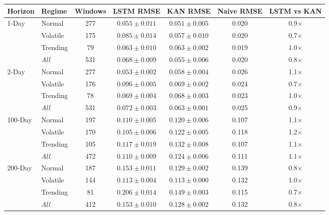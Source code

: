 \begin{table}[!ht]
\centering
\scriptsize
\renewcommand{\arraystretch}{1.15}
\setlength{\tabcolsep}{4pt}
\begin{tabular}{|l|l|c|c|c|c|c|}
\hline
\textbf{Horizon} & \textbf{Regime} & \textbf{Windows} & \textbf{LSTM RMSE} & \textbf{KAN RMSE} & \textbf{Naive RMSE} & \textbf{LSTM vs KAN} \\
\hline
  \multirow{3}{*}{1-Day} & Normal & 277 & $0.055 \pm 0.011$ & $0.051 \pm 0.005$ & 0.020 & 0.9$\times$ \\
   & Volatile & 175 & $0.085 \pm 0.014$ & $0.057 \pm 0.010$ & 0.020 & 0.7$\times$ \\
   & Trending & 79 & $0.063 \pm 0.010$ & $0.063 \pm 0.002$ & 0.019 & 1.0$\times$ \\
  & \textit{All} & 531 & $0.068 \pm 0.009$ & $0.055 \pm 0.006$ & 0.020 & 0.8$\times$ \\
\hline
  \multirow{3}{*}{2-Day} & Normal & 277 & $0.053 \pm 0.002$ & $0.058 \pm 0.004$ & 0.026 & 1.1$\times$ \\
   & Volatile & 176 & $0.096 \pm 0.005$ & $0.069 \pm 0.002$ & 0.024 & 0.7$\times$ \\
   & Trending & 78 & $0.069 \pm 0.004$ & $0.068 \pm 0.003$ & 0.023 & 1.0$\times$ \\
  & \textit{All} & 531 & $0.072 \pm 0.003$ & $0.063 \pm 0.001$ & 0.025 & 0.9$\times$ \\
\hline
  \multirow{3}{*}{100-Day} & Normal & 197 & $0.110 \pm 0.005$ & $0.120 \pm 0.006$ & 0.107 & 1.1$\times$ \\
   & Volatile & 170 & $0.105 \pm 0.006$ & $0.122 \pm 0.005$ & 0.118 & 1.2$\times$ \\
   & Trending & 105 & $0.117 \pm 0.019$ & $0.132 \pm 0.008$ & 0.107 & 1.1$\times$ \\
  & \textit{All} & 472 & $0.110 \pm 0.009$ & $0.124 \pm 0.006$ & 0.111 & 1.1$\times$ \\
\hline
  \multirow{3}{*}{200-Day} & Normal & 187 & $0.153 \pm 0.011$ & $0.129 \pm 0.002$ & 0.139 & 0.8$\times$ \\
   & Volatile & 144 & $0.113 \pm 0.004$ & $0.113 \pm 0.000$ & 0.132 & 1.0$\times$ \\
   & Trending & 81 & $0.206 \pm 0.014$ & $0.149 \pm 0.003$ & 0.115 & 0.7$\times$ \\
  & \textit{All} & 412 & $0.153 \pm 0.010$ & $0.128 \pm 0.002$ & 0.132 & 0.8$\times$ \\

\end{tabular}
\end{table}
